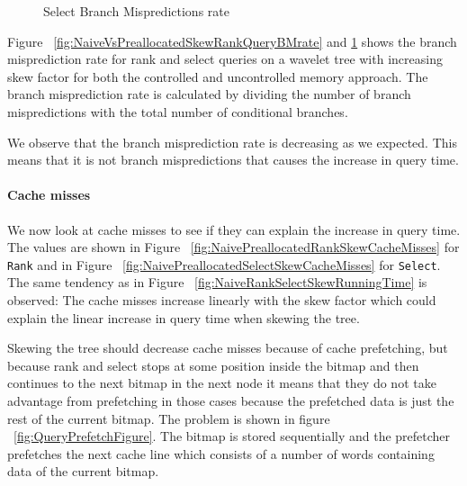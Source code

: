\begin{figure}
\caption{Select Branch Mispredictions rate}
\label{fig:NaiveVsPreallocatedSkewSelectQueryBMrate}

\end{figure}
 
Figure ~\ref{fig:NaiveVsPreallocatedSkewRankQueryBMrate} and \ref{fig:NaiveVsPreallocatedSkewSelectQueryBMrate} shows the branch misprediction rate for rank and select queries on a wavelet tree with increasing skew factor for both the controlled and uncontrolled memory approach. 
The branch misprediction rate is calculated by dividing the number of branch mispredictions with the total number of conditional branches.

We observe that the branch misprediction rate is decreasing as we expected. 
This means that it is not branch mispredictions that causes the increase in query time. 


\paragraph{Cache misses}
We now look at cache misses to see if they can explain the increase in query time. 
The values are shown in Figure ~\ref{fig:NaivePreallocatedRankSkewCacheMisses} for \texttt{Rank} and in Figure ~\ref{fig:NaivePreallocatedSelectSkewCacheMisses} for \texttt{Select}.
The same tendency as in Figure ~\ref{fig:NaiveRankSelectSkewRunningTime} is observed: 
The cache misses increase linearly with the skew factor which could explain the linear increase in query time when skewing the tree.

Skewing the tree should decrease cache misses because of cache prefetching, but because rank and select stops at some position inside the bitmap and then continues to the next bitmap in the next node it means that they do not take advantage from prefetching in those cases because the prefetched data is just the rest of the current bitmap. 
The problem is shown in figure ~\ref{fig:QueryPrefetchFigure}. The bitmap is stored sequentially and the prefetcher prefetches the next cache line which consists of a number of words containing data of the current bitmap.

